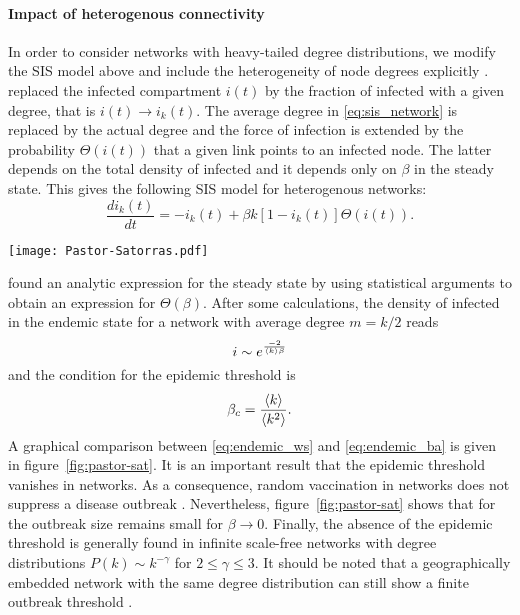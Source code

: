 \paragraph{Impact of heterogenous connectivity\color{Cayenne}{.}}
In order to consider networks with heavy-tailed degree distributions, we modify the SIS model above and include the heterogeneity of node degrees explicitly \citep{Pastor-Satorras_vespi:2001}.
\citeauthor{Pastor-Satorras_vespi:2001} replaced the infected compartment $i(t)$ by the fraction of infected with a given degree, that is $i(t)\rightarrow i_k(t)$.
The average degree in \eqref{eq:sis_network} is replaced by the actual degree and the force of infection is extended by the probability $\Theta (i(t))$ that a given link points to an infected node.
The latter depends on the total density of infected and it depends only on $\beta $ in the steady state.
This gives the following SIS model for heterogenous networks:
\begin{equation}\label{eq:sis_het_network}
\frac{di_k(t)}{dt}=-i_k(t)+\beta k [1-i_k(t)] \Theta (i(t)).
\end{equation}
%
\begin{SCfigure}
\texttt{[image: Pastor-Satorras.pdf]}
\caption{Fraction of infected in the endemic state for an SIS model.
The figure reveals the disappearance of the epidemic threshold for in \BA networks (red).
The epidemic threshold remains finite (here: $\beta _c=1/6$) for homogenous networks and $\beta _c \rightarrow 0$ for \BA networks.
From \citet{Pastor-Satorras_vespi:2001}.
}
\label{fig:pastor-sat}
\end{SCfigure}

%
\citeauthor{Pastor-Satorras_vespi:2001} found an analytic expression for the steady state by using statistical arguments to obtain an expression for $\Theta (\beta )$.
After some calculations, the density of infected in the endemic state for a \BA network with average degree $m=k/2$ reads
\begin{equation}\label{eq:endemic_ba}
i \sim e^{\frac{-2}{\left< k \right>\beta }}
\end{equation}
and the condition for the epidemic threshold is \citep{pastor-sat_2}
\begin{equation}\label{eq:degree_threshold}
\beta _c=\frac{\left< k \right>}{\left< k^2 \right>} .
\end{equation}
A graphical comparison between \eqref{eq:endemic_ws} and \eqref{eq:endemic_ba} is given in figure~\ref{fig:pastor-sat}.
It is an important result that the epidemic threshold vanishes in \BA networks.
As a consequence, random vaccination in \BA networks does not suppress a disease outbreak \citep{Keeling:2005}.
Nevertheless, figure~\ref{fig:pastor-sat} shows that for the outbreak size remains small for $\beta \rightarrow 0$.
Finally, the absence of the epidemic threshold is generally found in infinite scale-free networks with degree distributions $P(k)\sim k^{-\gamma }$ for $2\leqslant \gamma \leqslant 3$.
It should be noted that a geographically embedded network with the same degree distribution can still show a finite outbreak threshold \citep{Sander20031}.

